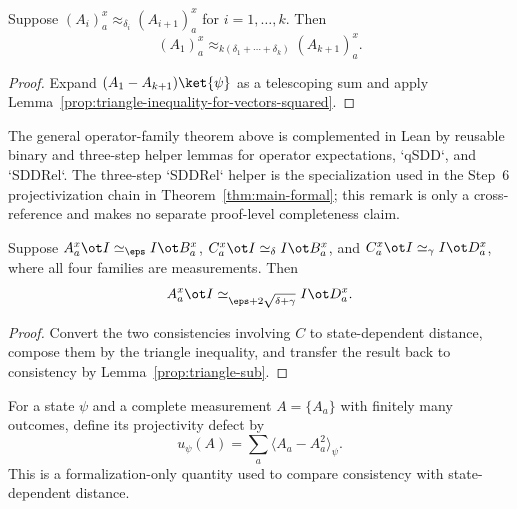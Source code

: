 \begin{lemma}\label{prop:triangle-inequality-for-approx_delta}
	\leanok
	Suppose $(A_i)_a^x \approx_{\delta_i} (A_{i+1})_a^x$ for $i=1,\dots,k$. Then
	\[
		(A_1)_a^x \approx_{k(\delta_1+\cdots+\delta_k)} (A_{k+1})_a^x.
	\]
\end{lemma}
\begin{proof}
	\leanok
	Expand $(A_1-A_{k+1})\ket{\psi}$ as a telescoping sum and apply Lemma~\ref{prop:triangle-inequality-for-vectors-squared}.
\end{proof}

\begin{remark}\label{rem:lean-finite-step-triangle-helpers}
	The general operator-family theorem above is complemented in Lean by reusable
	binary and three-step helper lemmas for operator expectations, `qSDD`, and
	`SDDRel`.  The three-step `SDDRel` helper is the specialization used in the
	Step~6 projectivization chain in Theorem~\ref{thm:main-formal}; this remark is
	only a cross-reference and makes no separate proof-level completeness claim.
\end{remark}

\begin{lemma}\label{prop:simeq-triangle-inequality}
	\leanok
	Suppose $A_a^x \ot I \simeq_\eps I \ot B_a^x$, $C_a^x \ot I \simeq_\delta I \ot B_a^x$, and $C_a^x \ot I \simeq_\gamma I \ot D_a^x$, where all four families are measurements. Then
	\[
		A_a^x \ot I \simeq_{\eps + 2\sqrt{\delta+\gamma}} I \ot D_a^x.
	\]
\end{lemma}
\begin{proof}
	\leanok
	Convert the two consistencies involving $C$ to state-dependent distance, compose them by the triangle inequality, and transfer the result back to consistency by Lemma~\ref{prop:triangle-sub}.
\end{proof}

\begin{definition}
\label{def:complete-measurement-projectivity-defect}
	\leanok
	For a state $\psi$ and a complete measurement $A=\{A_a\}$ with finitely
	many outcomes, define its projectivity defect by
	\[
		u_\psi(A)=\sum_a \langle A_a-A_a^2\rangle_\psi.
	\]
	This is a formalization-only quantity used to compare consistency with
	state-dependent distance.
\end{definition}

